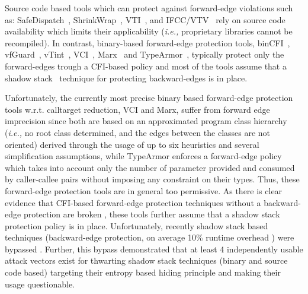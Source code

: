 Source code based tools which can protect against forward-edge violations such as: SafeDispatch~\cite{safedispatch:jang}, ShrinkWrap~\cite{haller:shrinkwrap}, VTI~\cite{bounov:interleaving}, 
and IFCC/VTV~\cite{vtv:tice} rely on source code availability which limits their applicability (\textit{i.e.,} proprietary libraries cannot be recompiled).
In contrast, binary-based forward-edge protection tools, binCFI~\cite{ccfir:zhang, zhang:usenix}, vfGuard~\cite{vfuard:aravind}, 
vTint~\cite{vtint:zhang}, VCI~\cite{vci:asiaccs}, Marx~\cite{marx} and TypeArmor~\cite{veen:typearmor}, typically protect only the forward-edges trough a CFI-based 
policy and most of the tools assume that a shadow stack~\cite{volodymyr:cpi} technique for protecting backward-edges is in place.


Unfortunately, the currently most precise binary based forward-edge protection tools w.r.t. calltarget reduction, 
VCI and Marx, suffer from forward edge imprecision since both are based on an approximated program class hierarchy  
(\textit{i.e.,} no root class determined, and the edges between the classes are not oriented) derived through the usage of up to 
six heuristics and several simplification assumptions, while TypeArmor enforces a forward-edge policy which takes into account only the number of parameter 
provided and consumed by caller-callee pairs without imposing any constraint on their types. 
Thus, these forward-edge protection tools are in general too permissive.
As there is clear evidence that CFI-based forward-edge protection techniques without a backward-edge protection are broken \cite{carlini:bending}, these tools further assume
that a shadow stack protection policy is in place. Unfortunately, recently shadow stack based techniques (backward-edge protection, on average 10\% runtime overhead \cite{shadowstack:overhead})
were bypassed \cite{safestack:bypass, safestack:bypassing}. Further, this bypass demonstrated that at least 4 independently usable attack vectors exist for thwarting shadow stack techniques 
(binary and source code based) targeting their entropy based hiding principle and making their usage questionable.

